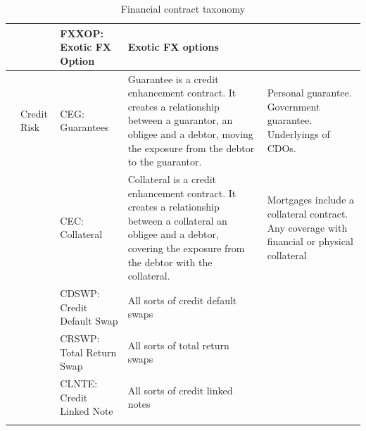 \documentclass[9pt,oneside]{amsart}
\begin{document}
\begin{longtable}{| p{}p{}p{}p{}p{} |}
	\hline 
	 & & FXXOP: Exotic FX Option & Exotic FX options & \\
	\hline 
	 & Credit Risk & CEG: Guarantees & Guarantee is a credit enhancement contract. It creates a relationship between a guarantor, an obligee and a debtor, moving the exposure from the debtor to the guarantor. & Personal guarantee. Government guarantee. Underlyings of CDOs. \\
	\hline 
	 & & CEC: Collateral & Collateral is a credit enhancement contract. It creates a relationship between a collateral an obligee and a debtor, covering the exposure from the debtor with the collateral. & Mortgages include a collateral contract. Any coverage with financial or physical collateral \\
	\hline 
	 & & CDSWP: Credit Default Swap & All sorts of credit default swaps &  \\
	\hline 
	 & & CRSWP: Total Return Swap & All sorts of total return swaps & \\
	\hline 
	 & & CLNTE: Credit Linked Note & All sorts of credit linked notes & \\
	\hline
	\caption{Financial contract taxonomy}
	\label{tbl:taxonomy}
\end{longtable}

\end{document}
